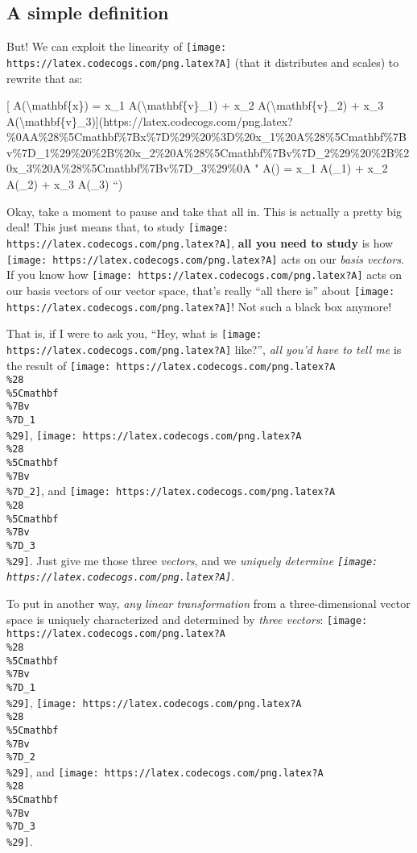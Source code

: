 \documentclass[]{article}
\begin{document}
\hypertarget{a-simple-definition}{%
\subsection{A simple definition}\label{a-simple-definition}}

But! We can exploit the linearity of
\texttt{[image: https://latex.codecogs.com/png.latex?A]} (that it distributes
and scales) to rewrite that as:

{[} A(\textbackslash{}mathbf\{x\}) = x\_1 A(\textbackslash{}mathbf\{v\}\_1) +
x\_2 A(\textbackslash{}mathbf\{v\}\_2) + x\_3
A(\textbackslash{}mathbf\{v\}\_3){]}(https://latex.codecogs.com/png.latex?\%0AA\%28\%5Cmathbf\%7Bx\%7D\%29\%20\%3D\%20x\_1\%20A\%28\%5Cmathbf\%7Bv\%7D\_1\%29\%20\%2B\%20x\_2\%20A\%28\%5Cmathbf\%7Bv\%7D\_2\%29\%20\%2B\%20x\_3\%20A\%28\%5Cmathbf\%7Bv\%7D\_3\%29\%0A
" A() = x\_1 A(\_1) + x\_2 A(\_2) + x\_3
A(\_3) ``)

Okay, take a moment to pause and take that all in. This is actually a pretty big
deal! This just means that, to study
\texttt{[image: https://latex.codecogs.com/png.latex?A]}, \textbf{all you need
to study} is how \texttt{[image: https://latex.codecogs.com/png.latex?A]} acts
on our \emph{basis vectors}. If you know how
\texttt{[image: https://latex.codecogs.com/png.latex?A]} acts on our basis
vectors of our vector space, that's really ``all there is'' about
\texttt{[image: https://latex.codecogs.com/png.latex?A]}! Not such a black box
anymore!

That is, if I were to ask you, ``Hey, what is
\texttt{[image: https://latex.codecogs.com/png.latex?A]} like?'', \emph{all
you'd have to tell me} is the result of
\texttt{[image: https://latex.codecogs.com/png.latex?A\\\%28\\\%5Cmathbf\\\%7Bv\\\%7D\_1\\\%29]},
\texttt{[image: https://latex.codecogs.com/png.latex?A\\\%28\\\%5Cmathbf\\\%7Bv\\\%7D\_2]},
and
\texttt{[image: https://latex.codecogs.com/png.latex?A\\\%28\\\%5Cmathbf\\\%7Bv\\\%7D\_3\\\%29]}.
Just give me those three \emph{vectors}, and we \emph{uniquely determine
\texttt{[image: https://latex.codecogs.com/png.latex?A]}}.

To put in another way, \emph{any linear transformation} from a three-dimensional
vector space is uniquely characterized and determined by \emph{three vectors}:
\texttt{[image: https://latex.codecogs.com/png.latex?A\\\%28\\\%5Cmathbf\\\%7Bv\\\%7D\_1\\\%29]},
\texttt{[image: https://latex.codecogs.com/png.latex?A\\\%28\\\%5Cmathbf\\\%7Bv\\\%7D\_2\\\%29]},
and
\texttt{[image: https://latex.codecogs.com/png.latex?A\\\%28\\\%5Cmathbf\\\%7Bv\\\%7D\_3\\\%29]}.
\end{document}

